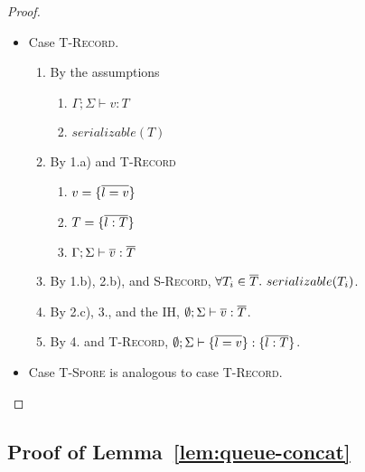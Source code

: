 \begin{proof}
\begin{itemize}
\item Case \textsc{T-Record}.
\begin{enumerate}
\item By the assumptions
  \begin{enumerate}[label=(\alph*)]
  \item $\Gamma ; \Sigma \vdash v : T$
  \item $serializable(T)$
  \end{enumerate}
\item By 1.a) and \textsc{T-Record}
  \begin{enumerate}[label=(\alph*)]
  \item $v = \{\overline{l = v}\}$
  \item $T = \{\overline{l : T}\}$
  \item $\Gamma ; \Sigma \vdash \overline{v} : \overline{T}$
  \end{enumerate}
\item By 1.b), 2.b), and \textsc{S-Record}, $\forall T_i \in \overline{T}.~serializable(T_i)$.
\item By 2.c), 3., and the IH, $\emptyset ; \Sigma \vdash \overline{v} : \overline{T}$.
\item By 4. and \textsc{T-Record}, $\emptyset ; \Sigma \vdash \{\overline{l = v}\} : \{\overline{l : T}\}$.
\end{enumerate}

\item Case \textsc{T-Spore} is analogous to case \textsc{T-Record}.
\end{itemize}
\end{proof}


\subsection{Proof of Lemma~\ref{lem:queue-concat}}\label{app:queue-concat}

